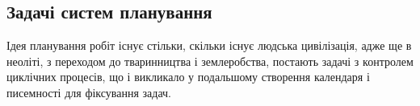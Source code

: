 \subsection{Задачі систем планування}

Ідея планування робіт існує стільки, скільки існує людська цивілізація, адже ще в неоліті, з переходом до тваринництва і землеробства, постають задачі з контролем циклічних процесів, що і викликало у подальшому створення календаря і писемності для фіксування задач.
